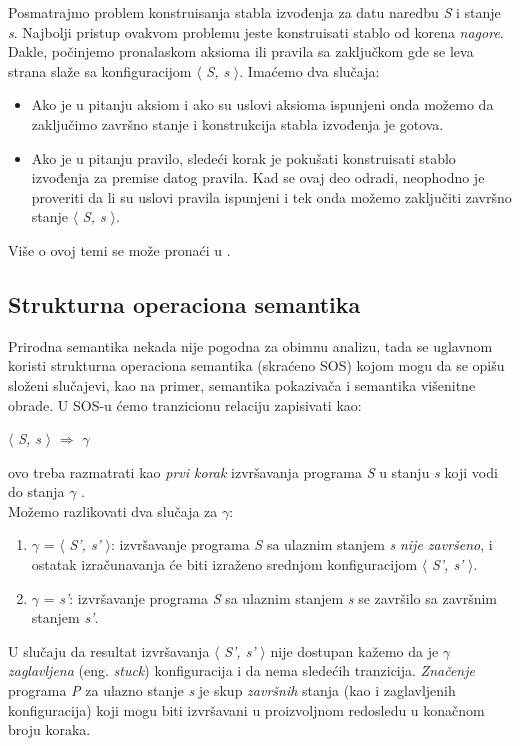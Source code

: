 \documentclass[a4paper]{article}
\begin{document}
Posmatrajmo problem konstruisanja stabla izvođenja za datu naredbu \textit{S} i stanje \textit{s}. Najbolji pristup ovakvom problemu jeste konstruisati stablo od korena \textit{nagore}. Dakle, počinjemo pronalaskom aksioma ili pravila sa zaključkom gde se leva strana slaže sa konfiguracijom $\langle$ \textit{S, s} $\rangle$. Imaćemo dva slučaja:
\begin{itemize}
	\item Ako je u pitanju aksiom i ako su uslovi aksioma ispunjeni onda možemo da zaključimo završno stanje i konstrukcija stabla izvođenja je gotova.
	\item Ako je u pitanju pravilo, sledeći korak je pokušati konstruisati stablo izvođenja za premise datog pravila. Kad se ovaj deo odradi, neophodno je proveriti da li su uslovi pravila ispunjeni i tek onda možemo zaključiti završno stanje  $\langle$ \textit{S, s} $\rangle$.
\end{itemize}
Više o ovoj temi se može pronaći u \cite{willey, opersem}.

\subsection{Strukturna operaciona semantika}
Prirodna semantika nekada nije pogodna za obimnu analizu, tada se uglavnom koristi strukturna operaciona semantika (skraćeno SOS) kojom mogu da se opišu složeni slučajevi, kao na primer, semantika pokazivača i semantika višenitne obrade. U SOS-u ćemo tranzicionu relaciju zapisivati kao:
\begin{center} $\langle$ \textit{S, s} $\rangle$ $\Longrightarrow$ \textit{$\gamma$} \end{center}
ovo treba razmatrati kao {\em prvi korak} izvršavanja programa \textit{S} u stanju \textit{s} koji vodi do stanja \textit{$\gamma$} \cite{opersem}.\\
Možemo razlikovati dva slučaja za $\gamma$:
\begin{enumerate}
	\item $\gamma$ = $\langle$ \textit{S', s'} $\rangle$: izvršavanje programa \textit{S} sa ulaznim stanjem \textit{s} {\em nije završeno}, i ostatak izračunavanja će biti izraženo srednjom konfiguracijom $\langle$ \textit{S', s'} $\rangle$.
	\item $\gamma$ = \textit{s'}: izvršavanje programa \textit{S} sa ulaznim stanjem \textit{s} se završilo sa završnim stanjem \textit{s'}.
\end{enumerate}
U slučaju da resultat izvršavanja $\langle$ \textit{S', s'} $\rangle$ nije dostupan kažemo da je $\gamma$ \textit{zaglavljena} (eng. {\em stuck}) konfiguracija i da nema sledećih tranzicija. \textit{Značenje} programa \textit{P} za ulazno stanje \textit{s} je skup \textit{završnih} stanja (kao i zaglavljenih konfiguracija) koji mogu biti izvršavani u proizvoljnom redosledu u konačnom broju koraka.
\end{document}
